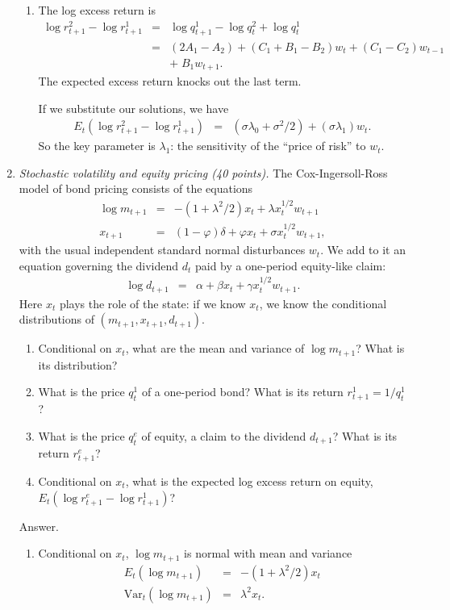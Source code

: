 \documentclass[11pt]{article}
\begin{document}
\begin{enumerate}
\begin{enumerate}
\item The log excess return is
\begin{eqnarray*}
    \log r^2_{t+1} - \log r^1_{t+1} &=& \log q^1_{t+1} - \log q^2_t + \log q^1_t \\
            &=& (2 A_1 - A_2) + (C_1 + B_1 - B_2) w_t + (C_1 - C_2) w_{t-1} \\
            &&        + \; B_1 w_{t+1} .
\end{eqnarray*}
The expected excess return knocks out the last term.

If we substitute our solutions, we have
\begin{eqnarray*}
   E_t \left( \log r^2_{t+1} - \log r^1_{t+1}\right)
            &=& (\sigma \lambda_0 + \sigma^2/2)  + (\sigma\lambda_1) w_t  .
\end{eqnarray*}
So the key parameter is $\lambda_1$:  the sensitivity of the ``price of risk''
to $w_t$.
\end{enumerate}

\item  {\it Stochastic volatility and equity pricing (40 points).\/}
The Cox-Ingersoll-Ross model of bond pricing consists of the equations
\begin{eqnarray*}
    \log m_{t+1} &=& -(1+\lambda^2/2) x_{t} + \lambda x_t^{1/2} w_{t+1} \\
        x_{t+1}  &=& (1-\varphi)\delta + \varphi x_t + \sigma x_t^{1/2} w_{t+1} ,
\end{eqnarray*}
with the usual independent standard normal disturbances $w_t$.
We add to it an equation governing the dividend $d_t$ paid by a one-period
equity-like claim:
\begin{eqnarray*}
    \log d_{t+1} &=& \alpha + \beta x_t + \gamma x_t^{1/2} w_{t+1} .
\end{eqnarray*}
Here $x_t$ plays the role of the state:  if we know $x_t$, we know the conditional
distributions of $ (m_{t+1}, x_{t+1}, d_{t+1})$.

\begin{enumerate}
\item  Conditional on $x_t$,
what are the mean and variance of $\log m_{t+1}$?
What is its distribution?
\item  What is the price $q^1_t$ of a one-period bond?
What is its return $ r^1_{t+1} = 1/q^1_t$?
\item  What is the price $q^e_t$ of equity, a claim to the dividend
$d_{t+1}$?
What is its return $r^e_{t+1}$?
\item  Conditional on $x_t$, what is the expected log excess return on equity,
$E_t (\log r^e_{t+1} - \log r^1_{t+1})$?
\end{enumerate}
%
Answer.
\begin{enumerate}
\item  Conditional on $x_t$, $\log m_{t+1}$ is normal with mean and variance
\begin{eqnarray*}
    E_t (\log m_{t+1}) &=& -(1+\lambda^2/2) x_{t} \\
    \mbox{Var}_t (\log m_{t+1}) &=& \lambda^2 x_t .
\end{eqnarray*}


\end{enumerate}
\end{enumerate}
\end{document}
